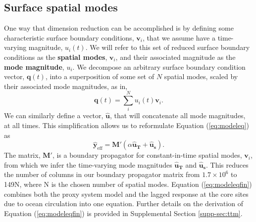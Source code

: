 \documentclass[draft]{agujournal2019}
\begin{document}
\subsection{Surface spatial modes \label{sec:spatmode}}
One way that dimension reduction can be accomplished is by defining some characteristic surface boundary conditions, $\mathbf{v}_{i}$, that we assume have a time-varying magnitude, $u_{i}(t)$. We will refer to this set of reduced surface boundary conditions as the \textbf{spatial modes}, $\mathbf{v}_{i}$, and their associated magnitude as the \textbf{mode magnitude}, $u_{i}$. We decompose an arbitrary surface boundary condition vector, $\mathbf{q}(t)$, into a superposition of some set of $N$ spatial modes, scaled by their associated mode magnitudes, as in,
\begin{equation}
\label{eq:surfbc}
\mathbf{q}(t) = \sum_{i}^{N} u_{i}(t) \mathbf{v}_{i}. 
\end{equation}
We can similarly define a vector, $\mathbf{\hat{u}}$, that will concatenate all mode magnitudes, at all times. This simplification allows us to reformulate Equation (\ref{eq:modeleq}) as
\begin{equation}
\label{eq:modeleqfin}
\mathbf{\mathbf{\hat{y}}}_{\mathrm{eff}} = \mathbf{M}'(\alpha \mathbf{\hat{u}_{T}} + \mathbf{\hat{u}_{s}}). 
\end{equation}
The matrix, $\mathbf{M}'$, is a boundary propagator for constant-in-time spatial modes, $\mathbf{v}_{i}$, from which we infer the time-varying mode magnitudes $\mathbf{\hat{u}_{T}}$ and $\mathbf{\hat{u}_{s}}$. This reduces the number of columns in our boundary propagator matrix from $1.7\times10^{6}$ to 149N, where N is the chosen number of spatial modes. Equation (\ref{eq:modeleqfin}) combines both the proxy system model and the lagged response at the core sites due to ocean circulation into one equation. Further details on the derivation of Equation (\ref{eq:modeleqfin}) is provided in Supplemental Section \ref{supp-sec:ttm}. 
\end{document}
